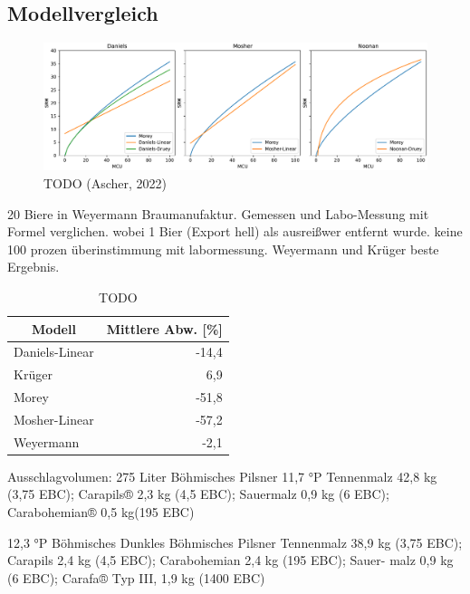 \documentclass[a4paper,parskip=half]{scrartcl}
\begin{document}
\subsection*{Modellvergleich}

\begin{figure}[h]
\centering
\includegraphics[width=14cm]{graph_srm.pdf}
\caption{TODO (Ascher, 2022)}
\label{fig:mcucompare}
\end{figure}


\parencite{KrausWeyermann2021b}
20 Biere in Weyermann Braumanufaktur. Gemessen und Labo-Messung mit Formel verglichen.
wobei 1 Bier (Export hell) als ausreißwer entfernt wurde.
keine 100 prozen überinstimmung mit labormessung.
Weyermann und Krüger beste Ergebnis.

\begin{table}[H]
\centering
\begin{tabular}{lr}
\toprule
\multicolumn{1}{c}{\textbf{Modell}} & \multicolumn{1}{c}{\textbf{Mittlere Abw. [\%]}} \\
\midrule
Daniels-Linear & -14,4 \\
Krüger & 6,9 \\
Morey & -51,8 \\
Mosher-Linear & -57,2 \\
Weyermann & -2,1 \\
\bottomrule
\end{tabular}
\caption{TODO \parencite{KrausWeyermann2021b}}
\label{table:modelcompare}
\end{table}

Ausschlagvolumen: 275 Liter
Böhmisches Pilsner
11,7 °P
Tennenmalz
42,8 kg (3,75 EBC); Carapils® 2,3 kg
(4,5 EBC); Sauermalz 0,9 kg (6 EBC);
Carabohemian® 0,5 kg(195 EBC)

12,3 °P Böhmisches Dunkles
Böhmisches Pilsner Tennenmalz 38,9
kg (3,75 EBC); Carapils 2,4 kg (4,5 EBC);
Carabohemian 2,4 kg (195 EBC); Sauer-
malz 0,9 kg (6 EBC); Carafa® Typ III, 1,9
kg (1400 EBC)
\end{document}
